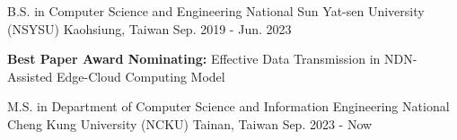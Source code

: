 

\begin{cventries}

  \cventry
  {B.S. in Computer Science and Engineering} %
  {National Sun Yat-sen University (NSYSU)} %
  {Kaohsiung, Taiwan} %
  {Sep. 2019 - Jun. 2023} %
  {
    \begin{cvitems} %
      \item {\textbf{Best Paper Award Nominating:} {Effective Data Transmission in NDN-Assisted Edge-Cloud Computing Model}}
    \end{cvitems}
  }

  \cventry
  {M.S. in Department of Computer Science and Information Engineering}
  {National Cheng Kung University (NCKU)}
  {Tainan, Taiwan} %
  {Sep. 2023 - Now} %
  {}

\end{cventries}
